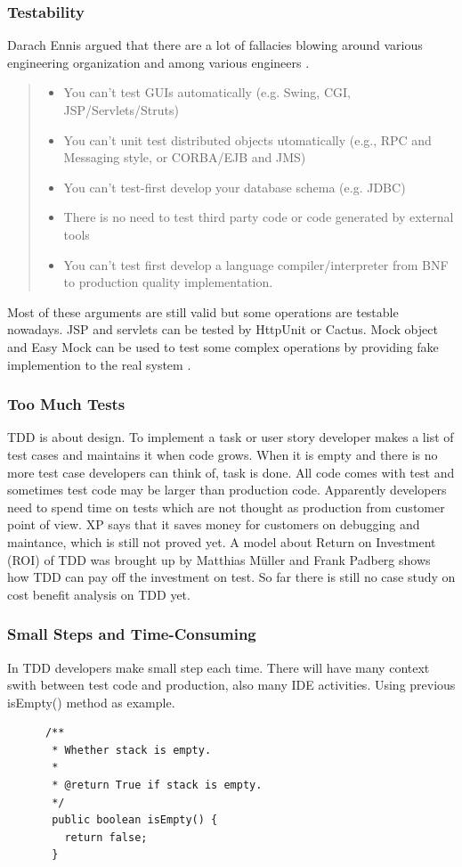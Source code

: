 \subsubsection{Testability}
Darach Ennis argued that there are a lot of fallacies blowing around
various engineering organization and among various engineers \cite{Beck:03}. 
\begin{quote}
\begin{itemize}
\item You can't test GUIs automatically (e.g. Swing, CGI, JSP/Servlets/Struts)
\item You can't unit test distributed objects utomatically (e.g., RPC and Messaging style, or CORBA/EJB and JMS)
\item You can't test-first develop your database schema (e.g. JDBC)
\item There is no need to test third party code or code generated by external tools
\item You can't test first develop a language compiler/interpreter from BNF
  to production quality implementation.
\end{itemize}
\end{quote}

Most of these arguments are still valid but some operations are testable
nowadays. JSP and servlets can be tested by HttpUnit\cite{HttpUnit} or
Cactus\cite{Cactus}.  Mock object and Easy Mock can be used to test some
complex operations by providing fake implemention to the real system
\cite{MockObject}.

\subsubsection{Too Much Tests}
TDD is about design. To implement a task or user story developer makes a
list of test cases and maintains it when code grows. When it is empty and
there is no more test case developers can think of, task is done. All code
comes with test and sometimes test code may be larger than production code.
Apparently developers need to spend time on tests which are not thought as
production from customer point of view. XP says that it saves money for
customers on debugging and maintance, which is still not proved yet. A
model about Return on Investment (ROI) of TDD was brought up by Matthias
M\"uller and Frank Padberg shows how TDD can pay off the investment on
test\cite{Muller:03}. So far there is still no case study on cost benefit
analysis on TDD yet.

\subsubsection{Small Steps and Time-Consuming}
In TDD developers make small step each time. There will have many context
swith between test code and production, also many IDE activities. Using
previous isEmpty() method as example.
    \begin{verbatim}
      /**
       * Whether stack is empty.
       * 
       * @return True if stack is empty.
       */
       public boolean isEmpty() {
         return false;
       }
    \end{verbatim}

